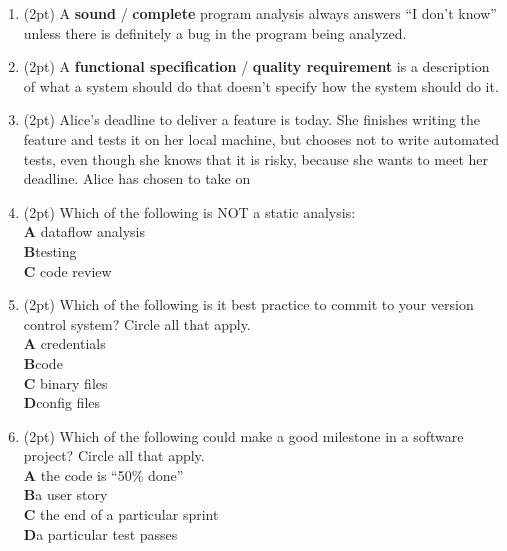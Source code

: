 \documentclass{report}
\newif\ifkey
\newcommand{\correct}[1]{\ifkey\color{red}\textbf{#1}\color{black}\else\textbf{#1}\fi\xspace}
\newcommand{\answershort}[1]{\ifkey\color{red}\underline{\textbf{#1}}\color{black}\else\underline{\hspace{3in}}\fi\xspace}
\newcommand*{\pts}[1]{\addtocounter{points}{#1}(#1pt)}
\begin{document}
\begin{spacing}{1.4}
\begin{enumerate}[leftmargin=*]
\item \pts{2} A \textbf{sound} / \correct{complete} program analysis always answers ``I don't know'' unless there
  is definitely a bug in the program being analyzed.

\item \pts{2} A \correct{functional specification} / \textbf{quality requirement} is a description of what a system should do that doesn’t specify how the system should do it.

\item \pts{2} Alice's deadline to deliver a feature is today. She finishes writing the feature and tests it on her local machine, but chooses not to write automated tests,
  even though she knows that it is risky, because
  she wants to meet her deadline. Alice has chosen to take on \answershort{technical debt}

\item \pts{2}
  Which of the following is NOT a static analysis:
  \\ \textbf{A}\hspace{0.2in} dataflow analysis
  \\ \correct{B}\hspace{0.2in}testing
  \\ \textbf{C}\hspace{0.2in} code review

\item \pts{2}
  Which of the following is it best practice to commit to your version control system? Circle all that apply.
  \\ \textbf{A}\hspace{0.2in} credentials
  \\ \correct{B}\hspace{0.2in}code
  \\ \textbf{C}\hspace{0.2in} binary files
  \\ \correct{D}\hspace{0.2in}config files

\item \pts{2}
  Which of the following could make a good milestone in a software project? Circle all that apply.
  \\ \textbf{A}\hspace{0.2in} the code is ``50\% done''
  \\ \correct{B}\hspace{0.2in}a user story
  \\ \textbf{C}\hspace{0.2in} the end of a particular sprint
  \\ \correct{D}\hspace{0.2in}a particular test passes


\end{enumerate}
\end{spacing}
\end{document}
